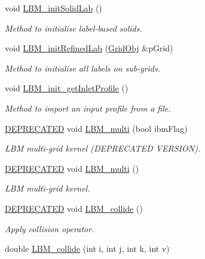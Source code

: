 \begin{DoxyCompactItemize}
void \hyperlink{class_grid_obj_a5dd08730d7cdea576bb4b337786a9bcf}{L\+B\+M\+\_\+init\+Solid\+Lab} ()
\begin{DoxyCompactList}\small\item\em Method to initialise label-\/based solids. \end{DoxyCompactList}\item 
void \hyperlink{class_grid_obj_a3ba133d06625fb576ca0909b946033b2}{L\+B\+M\+\_\+init\+Refined\+Lab} (\hyperlink{class_grid_obj}{Grid\+Obj} \&p\+Grid)
\begin{DoxyCompactList}\small\item\em Method to initialise all labels on sub-\/grids. \end{DoxyCompactList}\item 
void \hyperlink{class_grid_obj_a023713976673d029103690a91c5415f9}{L\+B\+M\+\_\+init\+\_\+get\+Inlet\+Profile} ()
\begin{DoxyCompactList}\small\item\em Method to import an input profile from a file. \end{DoxyCompactList}\item 
\hyperlink{stdafx_8h_ac1e8a42306d8e67cb94ca31c3956ee78}{D\+E\+P\+R\+E\+C\+A\+T\+ED} void \hyperlink{class_grid_obj_ac69eef5f465527c9ccf8941115c68770}{L\+B\+M\+\_\+multi} (bool ibm\+Flag)
\begin{DoxyCompactList}\small\item\em L\+BM multi-\/grid kernel (D\+E\+P\+R\+E\+C\+A\+T\+ED V\+E\+R\+S\+I\+ON). \end{DoxyCompactList}\item 
\hyperlink{stdafx_8h_ac1e8a42306d8e67cb94ca31c3956ee78}{D\+E\+P\+R\+E\+C\+A\+T\+ED} void \hyperlink{class_grid_obj_a21ee25286fe790eaabcdbf5602f1f38d}{L\+B\+M\+\_\+multi} ()
\begin{DoxyCompactList}\small\item\em L\+BM multi-\/grid kernel. \end{DoxyCompactList}\item 
\hyperlink{stdafx_8h_ac1e8a42306d8e67cb94ca31c3956ee78}{D\+E\+P\+R\+E\+C\+A\+T\+ED} void \hyperlink{class_grid_obj_a0feb0f9406f626e90c57045350161b22}{L\+B\+M\+\_\+collide} ()
\begin{DoxyCompactList}\small\item\em Apply collision operator. \end{DoxyCompactList}\item 
double \hyperlink{class_grid_obj_a1540c0d77a47e60a7fd55f51e5a98451}{L\+B\+M\+\_\+collide} (int i, int j, int k, int v)

\end{DoxyCompactItemize}
